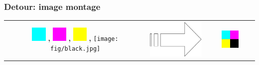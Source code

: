 \documentclass[english,serif,mathserif,xcolor=pdftex,dvipsnames,table]{beamer}
\begin{document}
\begin{frame}[fragile]
  \frametitle{Detour: image montage}


  \+
  \begin{tabular}[c]{ccc}
    \includegraphics[width=0.1\textwidth]{fig/cyan.jpg}    \textbf{,}
    \includegraphics[width=0.1\textwidth]{fig/magenta.jpg} \textbf{,}
    \includegraphics[width=0.1\textwidth]{fig/yellow.jpg}  \textbf{,}
    \texttt{[image: fig/black.jpg]}
    &
    {\includegraphics[width=0.1\linewidth,totalheight=0.45\textheight]{fig/arrow.pdf}}
    &
    \includegraphics[width=0.4\textwidth]{fig/cmyk.jpg}
  \end{tabular}
\end{frame}
\end{document}
